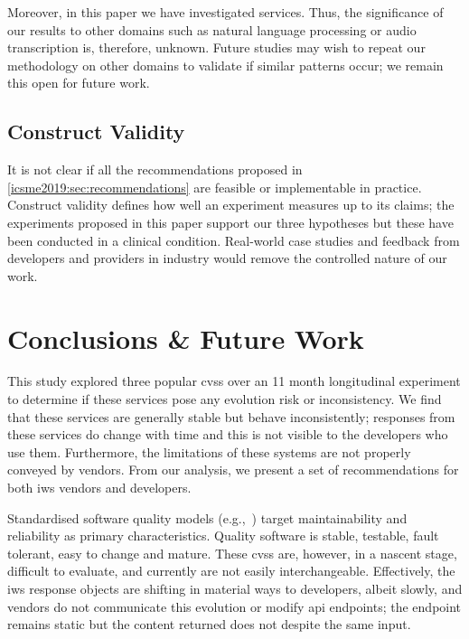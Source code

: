 Moreover, in this paper we have investigated \textit{} services. Thus, the significance of our results to other domains such as natural language processing or audio transcription is, therefore, unknown. Future studies may wish to repeat our methodology on other domains to validate if similar patterns occur; we remain this open for future work.

\subsection{Construct Validity}

It is not clear if all the recommendations proposed in \cref{icsme2019:sec:recommendations}  are feasible or implementable in practice. Construct validity defines how well an experiment measures up to its claims; the experiments proposed in this paper support our three hypotheses but these have been conducted in a clinical condition. Real-world case studies and feedback from developers and providers in industry would remove the controlled nature of our work.

\section{Conclusions \& Future Work}
\label{icsme2019:sec:conclusions}

This study explored three popular \glspl{cvs} over an 11 month longitudinal experiment to determine if these services pose any evolution risk or inconsistency. We find that these services are generally stable but behave inconsistently; responses from these services do change with time and this is not visible to the developers who use them. Furthermore, the limitations of these systems are not properly conveyed by vendors. From our analysis, we present a set of recommendations for both \gls{iws} vendors and developers.

Standardised software quality models (e.g.,~\citep{ISO9126:1999}) target maintainability and reliability as primary characteristics. Quality software is stable, testable, fault tolerant, easy to change and mature. These \glspl{cvs} are, however, in a nascent stage, difficult to evaluate, and currently are not easily interchangeable. Effectively, the \gls{iws} response objects are shifting in material ways to developers, albeit slowly, and vendors do not  communicate this evolution or modify \gls{api} endpoints; the endpoint remains static but the content returned does not despite the same input.


